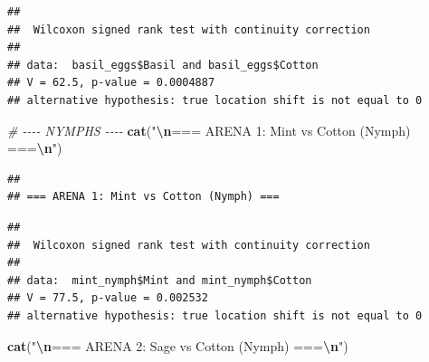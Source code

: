 \documentclass[
]{article}
\newenvironment{Shaded}{\begin{snugshade}}{\end{snugshade}}
\newcommand{\AttributeTok}[1]{\textcolor[rgb]{0.13,0.29,0.53}{#1}}
\newcommand{\CommentTok}[1]{\textcolor[rgb]{0.56,0.35,0.01}{\textit{#1}}}
\newcommand{\ConstantTok}[1]{\textcolor[rgb]{0.56,0.35,0.01}{#1}}
\newcommand{\FunctionTok}[1]{\textcolor[rgb]{0.13,0.29,0.53}{\textbf{#1}}}
\newcommand{\NormalTok}[1]{#1}
\newcommand{\OtherTok}[1]{\textcolor[rgb]{0.56,0.35,0.01}{#1}}
\newcommand{\SpecialCharTok}[1]{\textcolor[rgb]{0.81,0.36,0.00}{\textbf{#1}}}
\newcommand{\StringTok}[1]{\textcolor[rgb]{0.31,0.60,0.02}{#1}}
\begin{document}
\begin{verbatim}
## 
##  Wilcoxon signed rank test with continuity correction
## 
## data:  basil_eggs$Basil and basil_eggs$Cotton
## V = 62.5, p-value = 0.0004887
## alternative hypothesis: true location shift is not equal to 0
\end{verbatim}

\begin{Shaded}
\begin{Highlighting}[]
\CommentTok{\# {-}{-}{-}{-} NYMPHS {-}{-}{-}{-}}
\FunctionTok{cat}\NormalTok{(}\StringTok{"}\SpecialCharTok{\textbackslash{}n}\StringTok{=== ARENA 1: Mint vs Cotton (Nymph) ===}\SpecialCharTok{\textbackslash{}n}\StringTok{"}\NormalTok{)}
\end{Highlighting}
\end{Shaded}

\begin{verbatim}
## 
## === ARENA 1: Mint vs Cotton (Nymph) ===
\end{verbatim}

\begin{Shaded}
\end{Shaded}

\begin{verbatim}
## 
##  Wilcoxon signed rank test with continuity correction
## 
## data:  mint_nymph$Mint and mint_nymph$Cotton
## V = 77.5, p-value = 0.002532
## alternative hypothesis: true location shift is not equal to 0
\end{verbatim}

\begin{Shaded}
\begin{Highlighting}[]
\FunctionTok{cat}\NormalTok{(}\StringTok{"}\SpecialCharTok{\textbackslash{}n}\StringTok{=== ARENA 2: Sage vs Cotton (Nymph) ===}\SpecialCharTok{\textbackslash{}n}\StringTok{"}\NormalTok{)}
\end{Highlighting}
\end{Shaded}
\end{document}
